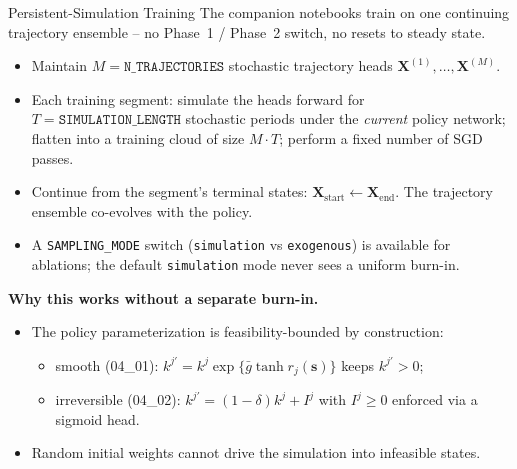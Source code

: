 \documentclass[aspectratio=169,11pt]{beamer}
\newcommand{\emphc}[1]{\textcolor{harvardcrimson}{#1}}
\begin{document}
\begin{frame}{Persistent-Simulation Training}
The companion notebooks train on \emphc{one continuing trajectory ensemble} -- no Phase~1 / Phase~2 switch, no resets to steady state.

\vspace{0.15em}
\begin{itemize}
    \item Maintain $M = \texttt{N\_TRAJECTORIES}$ stochastic trajectory heads $\bm{X}^{(1)}, \ldots, \bm{X}^{(M)}$.
    \item Each \emphc{training segment}: simulate the heads forward for $T = \texttt{SIMULATION\_LENGTH}$ stochastic periods under the \emph{current} policy network; flatten into a training cloud of size $M\!\cdot\!T$; perform a fixed number of SGD passes.
    \item Continue from the segment's terminal states: $\bm{X}_{\mathrm{start}} \leftarrow \bm{X}_{\mathrm{end}}$. The trajectory ensemble \emphc{co-evolves} with the policy.
    \item A \texttt{SAMPLING\_MODE} switch (\texttt{simulation} vs \texttt{exogenous}) is available for ablations; the default \texttt{simulation} mode never sees a uniform burn-in.
\end{itemize}

\vspace{0.15em}
\textbf{Why this works without a separate burn-in.}
\begin{itemize}
    \item The policy parameterization is feasibility-bounded by construction:
    \begin{itemize}\itemsep1pt
        \item smooth (04\_01): $k^{j\prime} = k^j \exp\{\bar g \tanh r_j(\bm{s})\}$ keeps $k^{j\prime} > 0$;
        \item irreversible (04\_02): $k^{j\prime} = (1-\delta)k^j + I^j$ with $I^j \ge 0$ enforced via a sigmoid head.
    \end{itemize}
    \item Random initial weights cannot drive the simulation into infeasible states.
\end{itemize}
\end{frame}
\end{document}
